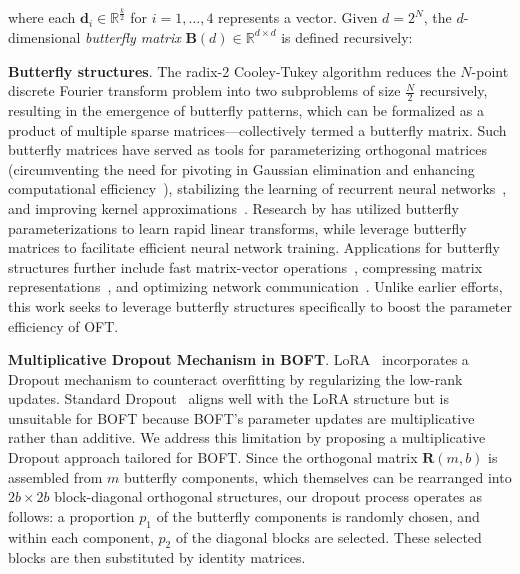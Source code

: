 where each $\bm{d}_i\in\mathbb{R}^{\frac{k}{2}}$ for $i=1,\ldots,4$ represents a vector. Given $d=2^N$, the $d$-dimensional \emph{butterfly matrix} $\bm{B}(d)\in\mathbb{R}^{d\times d}$ is defined recursively:

\textbf{Butterfly structures}. The radix-2 Cooley-Tukey algorithm reduces the $N$-point discrete Fourier transform problem into two subproblems of size $\frac{N}{2}$ recursively, resulting in the emergence of butterfly patterns, which can be formalized as a product of multiple sparse matrices—collectively termed a butterfly matrix. Such butterfly matrices have served as tools for parameterizing orthogonal matrices (circumventing the need for pivoting in Gaussian elimination and enhancing computational efficiency~\cite{parker1995random}), stabilizing the learning of recurrent neural networks~\cite{jing2017tunable}, and improving kernel approximations~\cite{munkhoeva2018quadrature}. Research by \cite{dao2019learning,dao2019kaleidoscope} has utilized butterfly parameterizations to learn rapid linear transforms, while \cite{chen2022pixelated,dao2022monarch} leverage butterfly matrices to facilitate efficient neural network training. Applications for butterfly structures further include fast matrix-vector operations~\cite{michielssen1996multilevel,o2010algorithm}, compressing matrix representations~\cite{li2015butterfly}, and optimizing network communication~\cite{klasing1994broadcasting,li2003linear,rajasingh2016transmission}. Unlike earlier efforts, this work seeks to leverage butterfly structures specifically to boost the parameter efficiency of OFT.

\textbf{Multiplicative Dropout Mechanism in BOFT}. LoRA~\cite{hulora2022} incorporates a Dropout mechanism to counteract overfitting by regularizing the low-rank updates. Standard Dropout~\cite{srivastava2014dropout} aligns well with the LoRA structure but is unsuitable for BOFT because BOFT's parameter updates are multiplicative rather than additive. We address this limitation by proposing a multiplicative Dropout approach tailored for BOFT. Since the orthogonal matrix $\bm{R}(m,b)$ is assembled from $m$ butterfly components, which themselves can be rearranged into $2b \times 2b$ block-diagonal orthogonal structures, our dropout process operates as follows: a proportion $p_1$ of the butterfly components is randomly chosen, and within each component, $p_2$ of the diagonal blocks are selected. These selected blocks are then substituted by identity matrices.



